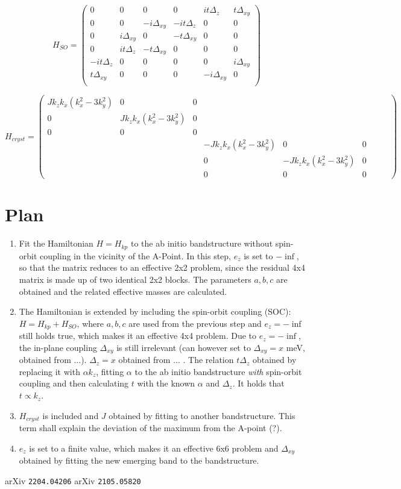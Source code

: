 \documentclass{article}
\begin{document}
$$ H_{SO} = \begin{pmatrix} 
0 & 0 & 0 & 0 & it\Delta_z & t \Delta_{xy} \\
0 & 0 & -i \Delta_{xy} & -it\Delta_z & 0 & 0 \\
0 & i \Delta_{xy} & 0 & -t \Delta_{xy} & 0 & 0 \\
0 & it\Delta_z & -t \Delta_{xy} & 0 & 0 & 0 \\
-it\Delta_z & 0 & 0 & 0 & 0 & i \Delta_{xy} \\
t \Delta_{xy} & 0 & 0 & 0 & -i \Delta_{xy} & 0 \\
\end{pmatrix}$$

$$ H_{cryst}= \begin{pmatrix}
J k_z k_x (k_x^2-3k_y^2) & 0 & 0 &&& \\
0 & J k_z k_x (k_x^2-3k_y^2) & 0 &&& \\
0 & 0 & 0 &&& \\
&&& -J k_z k_x (k_x^2-3k_y^2) & 0 & 0 \\
&&& 0 & -J k_z k_x (k_x^2-3k_y^2) & 0 &&& \\
&&& 0 & 0 & 0 &&&
\end{pmatrix}$$

\section*{Plan}
\begin{enumerate}
	\item Fit the Hamiltonian $H = H_{kp}$ to the ab initio bandstructure without spin-orbit coupling in the vicinity of the A-Point. In this step, $e_z$ is set to $-\inf$, so that the matrix reduces to an effective 2x2 problem, since the residual 4x4 matrix is made up of two identical 2x2 blocks. The parameters $a, b, c$ are obtained and the related effective masses are calculated.
	\item The Hamiltonian is extended by including the spin-orbit coupling (SOC): $H = H_{kp} + H_{SO}$, where $a,b,c$ are used from the previous step and $e_z = -\inf$ still holds true, which makes it an effective 4x4 problem. Due to $e_z = -\inf$, the in-plane coupling $\Delta_{xy}$ is still irrelevant (can however set to $\Delta_{xy} = x$ meV, obtained from ...). $\Delta_{z} = x$ obtained from ... . The relation $t \Delta_z$ obtained by replacing it with $\alpha k_z$, fitting $\alpha$ to the ab initio bandstructure \textit{with} spin-orbit coupling and then calculating $t$ with the known $\alpha$ and $\Delta_z$. It holds that $t \propto k_z$.
	\item $H_{cryst}$ is included and $J$ obtained by fitting to another bandstructure. This term shall explain the deviation of the maximum from the A-point (?).
	\item $e_z$ is set to a finite value, which makes it an effective 6x6 problem and $\Delta_{xy}$ obtained by fitting the new emerging band to the bandstructure.
\end{enumerate}

\begin{thebibliography}{99}
   arXiv {\tt 2204.04206}
   arXiv {\tt 2105.05820}
\end{thebibliography}
\end{document}
